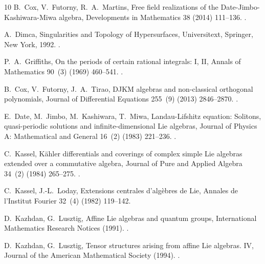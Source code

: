 \documentclass[final,nopreprintline]{elsarticle}
\theoremstyle{definition}
\numberwithin{equation}{section}
\theoremstyle{remark}
\begin{document}
\begin{thebibliography}{10}
B.~Cox, V.~Futorny, R.~A.~Martins,
{Free field realizations of the Date-Jimbo-Kashiwara-Miwa algebra},
Developments in Mathematics 38 (2014) 111--136.
\newblock \href{https://doi.org/10.1007/978-3-319-09804-3_5}{}.

A.~Dimca,
{Singularities and Topology of Hypersurfaces},
Universitext, Springer, New York, 1992.
\newblock \href{https://doi.org/10.1007/978-1-4612-4404-2}{}.

P.~A.~Griffiths,
{On the periods of certain rational integrals: I, II},
Annals of Mathematics 90~(3) (1969) 460--541.
\newblock \href{https://doi.org/10.2307/1970746}{}.

B.~Cox, V.~Futorny, J.~A.~Tirao,
{DJKM algebras and non-classical orthogonal polynomials},
Journal of Differential Equations 255~(9) (2013) 2846--2870.
\newblock \href{https://doi.org/10.1016/j.jde.2013.07.020}{}.

E.~Date, M.~Jimbo, M.~Kashiwara, T.~Miwa,
{Landau-Lifshitz equation: Solitons, quasi-periodic solutions and infinite-dimensional Lie algebras},
Journal of Physics A: Mathematical and General 16~(2) (1983) 221--236.
\newblock \href{https://doi.org/10.1088/0305-4470/16/2/006}{}.

C.~Kassel,
{K\"{a}hler differentials and coverings of complex simple Lie algebras extended over a commutative algebra},
Journal of Pure and Applied Algebra 34~(2) (1984) 265--275.
\newblock \href{https://doi.org/10.1016/0022-4049(84)90040-9}{}.

C.~Kassel, J.-L.~Loday,
{Extensions centrales d'alg\`ebres de Lie},
Annales de l'Institut Fourier 32~(4) (1982) 119--142.

D.~Kazhdan, G.~Lusztig,
{Affine Lie algebras and quantum groups},
International Mathematics Research Notices (1991).
\newblock \href{https://doi.org/10.1155/S1073792891000041}{}.

D.~Kazhdan, G.~Lusztig,
{Tensor structures arising from affine Lie algebras. IV},
Journal of the American Mathematical Society (1994).
\newblock \href{https://doi.org/10.1007/s00464-008-0019-5}{}.


\end{thebibliography}
\end{document}
